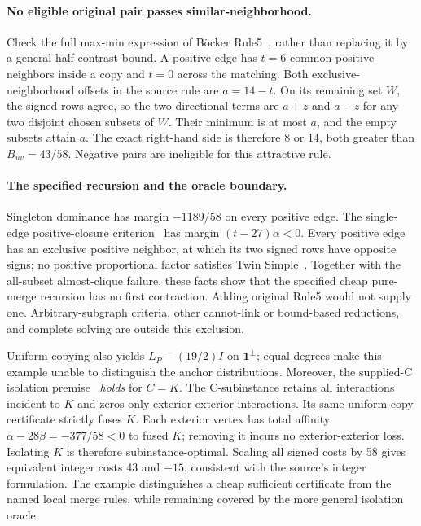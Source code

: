 \documentclass[sigconf,anonymous,review]{acmart}
\newcommand{\1}{\mathbf{1}}
\begin{document}
\paragraph{No eligible original pair passes similar-neighborhood.}
Check the full max-min expression of B\"ocker Rule5~\cite{bocker2011exact},
rather than replacing it by a general half-contrast bound. A positive edge has
$t=6$ common positive neighbors inside a copy and $t=0$ across the matching.
Both exclusive-neighborhood offsets in the source rule are $a=14-t$.
On its remaining set $W$, the signed rows agree, so the two directional
terms are $a+z$ and $a-z$ for any two disjoint chosen subsets of $W$.
Their minimum is at most $a$, and the empty subsets attain $a$.
The exact right-hand side is therefore 8 or 14, both greater than
$B_{uv}=43/58$. Negative pairs are ineligible for this attractive rule.

\paragraph{The specified recursion and the oracle boundary.}
Singleton dominance has margin $-1189/58$ on every positive edge.
The single-edge positive-closure criterion~\cite{lange2019combinatorial}
has margin $(t-27)\alpha<0$. Every positive edge has an exclusive positive
neighbor, at which its two signed rows have opposite signs; no positive
proportional factor satisfies Twin Simple~\cite{blasius2022branch}.
Together with the all-subset almost-clique failure, these facts show that
the specified cheap pure-merge recursion has no first contraction.
Adding original Rule5 would not supply one. Arbitrary-subgraph criteria,
other cannot-link or bound-based reductions, and complete solving are outside
this exclusion.

Uniform copying also yields $L_P-(19/2)I$ on $\1^\perp$; equal degrees make
this example unable to distinguish the anchor distributions.
Moreover, the supplied-C isolation premise~\cite{blasius2022branch}
\emph{holds} for $C=K$. The C-subinstance retains all interactions incident
to $K$ and zeros only exterior-exterior interactions. Its same uniform-copy
certificate strictly fuses $K$. Each exterior vertex has total affinity
$\alpha-28\beta=-377/58<0$ to fused $K$; removing it incurs no
exterior-exterior loss. Isolating $K$ is therefore subinstance-optimal.
Scaling all signed costs by 58 gives equivalent integer costs 43 and $-15$,
consistent with the source's integer formulation. The example distinguishes
a cheap sufficient certificate from the named local merge rules, while
remaining covered by the more general isolation oracle.
\end{document}
